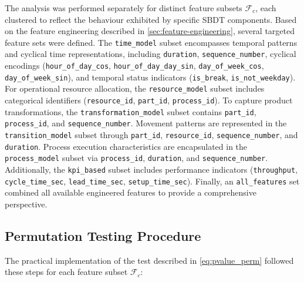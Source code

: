 The analysis was performed separately for distinct feature subsets $\mathcal{F}_c$, each clustered to reflect the behaviour exhibited by specific SBDT components. Based on the feature engineering described in \autoref{sec:feature-engineering}, several targeted feature sets were defined. The \texttt{time\_model} subset encompasses temporal patterns and cyclical time representations, including \texttt{duration}, \texttt{sequence\_number}, cyclical encodings (\texttt{hour\_of\_day\_cos}, \texttt{hour\_of\_day\_day\_sin}, \texttt{day\_of\_week\_cos}, \texttt{day\_of\_week\_sin}), and temporal status indicators (\texttt{is\_break}, \texttt{is\_not\_weekday}). For operational resource allocation, the \texttt{resource\_model} subset includes categorical identifiers (\texttt{resource\_id}, \texttt{part\_id}, \texttt{process\_id}). To capture product transformations, the \texttt{transformation\_model} subset contains \texttt{part\_id}, \texttt{process\_id}, and \texttt{sequence\_number}. Movement patterns are represented in the \texttt{transition\_model} subset through \texttt{part\_id}, \texttt{resource\_id}, \texttt{sequence\_number}, and \texttt{duration}. Process execution characteristics are encapsulated in the \texttt{process\_model} subset via \texttt{process\_id}, \texttt{duration}, and \texttt{sequence\_number}. Additionally, the \texttt{kpi\_based} subset includes performance indicators (\texttt{throughput}, \texttt{cycle\_time\_sec}, \texttt{lead\_time\_sec}, \texttt{setup\_time\_sec}). Finally, an \texttt{all\_features} set combined all available engineered features to provide a comprehensive perspective.

\subsection*{Permutation Testing Procedure}

The practical implementation of the test described in \autoref{eq:pvalue_perm} followed these steps for each feature subset $\mathcal{F}_c$:


